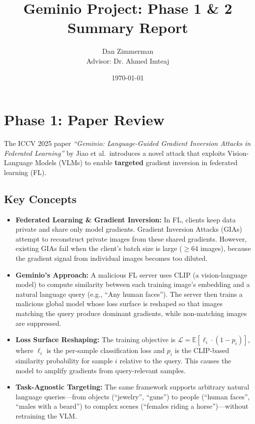 \documentclass[11pt]{article}
\title{Geminio Project: Phase 1 \& 2 Summary Report}
\author{Dan Zimmerman \\ Advisor: Dr. Ahmed Imteaj}
\date{\today}
\begin{document}
\maketitle

\section{Phase 1: Paper Review}

The ICCV 2025 paper \textit{``Geminio: Language-Guided Gradient Inversion Attacks in Federated Learning''} by Jiao et al.\ introduces a novel attack that exploits Vision-Language Models (VLMs) to enable \textbf{targeted} gradient inversion in federated learning (FL).

\subsection{Key Concepts}

\begin{itemize}[nosep]
    \item \textbf{Federated Learning \& Gradient Inversion:} In FL, clients keep data private and share only model gradients. Gradient Inversion Attacks (GIAs) attempt to reconstruct private images from these shared gradients. However, existing GIAs fail when the client's batch size is large ($\geq$64 images), because the gradient signal from individual images becomes too diluted.

    \item \textbf{Geminio's Approach:} A malicious FL server uses CLIP (a vision-language model) to compute similarity between each training image's embedding and a natural language query (e.g., ``Any human faces''). The server then trains a malicious global model whose loss surface is reshaped so that images matching the query produce dominant gradients, while non-matching images are suppressed.

    \item \textbf{Loss Surface Reshaping:} The training objective is $\mathcal{L} = \mathbb{E}[\ell_i \cdot (1 - p_i)]$, where $\ell_i$ is the per-sample classification loss and $p_i$ is the CLIP-based similarity probability for sample $i$ relative to the query. This causes the model to amplify gradients from query-relevant samples.

    \item \textbf{Task-Agnostic Targeting:} The same framework supports arbitrary natural language queries---from objects (``jewelry'', ``guns'') to people (``human faces'', ``males with a beard'') to complex scenes (``females riding a horse'')---without retraining the VLM.
\end{itemize}
\end{document}

